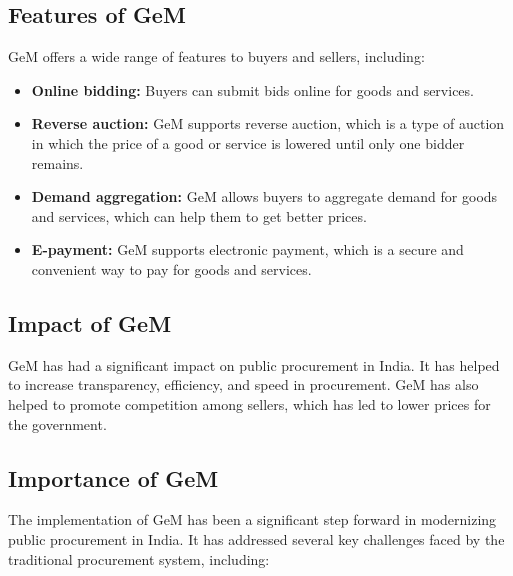 \subsection{Features of GeM}

GeM offers a wide range of features to buyers and sellers, including:

\begin{itemize}
    \item \textbf{Online bidding:} Buyers can submit bids online for goods and services.
    \item \textbf{Reverse auction:} GeM supports reverse auction, which is a type of auction in which the price of a good or service is lowered until only one bidder remains.
    \item \textbf{Demand aggregation:} GeM allows buyers to aggregate demand for goods and services, which can help them to get better prices.
    \item \textbf{E-payment:} GeM supports electronic payment, which is a secure and convenient way to pay for goods and services.
\end{itemize}

\subsection{Impact of GeM}

GeM has had a significant impact on public procurement in India. It has helped to increase transparency, efficiency, and speed in procurement. GeM has also helped to promote competition among sellers, which has led to lower prices for the government.

\subsection{Importance of GeM}

The implementation of GeM has been a significant step forward in modernizing public procurement in India. It has addressed several key challenges faced by the traditional procurement system, including:


